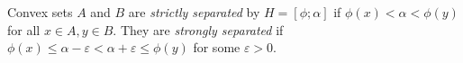 Convex sets $A$ and $B$ are \emph{strictly separated} by $H=[\phi;\alpha]$ if $\phi(x)<\alpha<\phi(y)$ for all $x\in A,y\in B$. They are \emph{strongly separated} if $\phi(x)\leqslant\alpha-\varepsilon<\alpha+\varepsilon\leqslant\phi(y)$ for some $\varepsilon>0$.
